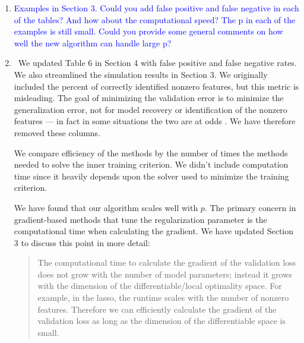 \documentclass[]{article}
\newcommand{\point}[1]{\item \textcolor{blue}{#1}}
\newcommand{\reply}{\item[]\ }
\begin{document}
\begin{enumerate}
		\point{Examples in Section 3. Could you add false positive and false negative in each of the tables? And how about the computational speed? The p in each of the examples is still small. Could you provide some general comments on how well the new algorithm can handle large p?}
		
		\reply We updated Table 6 in Section 4 with false positive and false negative rates. We also streamlined the simulation results in Section 3. We originally included the percent of correctly identified nonzero features, but this metric is misleading. The goal of minimizing the validation error is to minimize the generalization error, not for model recovery or identification of the nonzero features --- in fact in some situations the two are at odds \citep{yang2005can, arlot2010survey}. We have therefore removed these columns.
		
		We compare efficiency of the methods by the number of times the methods needed to solve the inner training criterion. We didn't include computation time since it heavily depends upon the solver used to minimize the training criterion.
		
		We have found that our algorithm scales well with $p$. The primary concern in gradient-based methods that tune the regularization parameter is the computational time when calculating the gradient. We have updated Section 3 to discuss this point in more detail:
		
		\begin{quote}
			 The computational time to calculate the gradient of the validation loss does not grow with the number of model parameters; instead it grows with the dimension of the differentiable/local optimality space. For example, in the lasso, the runtime scales with the number of nonzero features. Therefore we can efficiently calculate the gradient of the validation loss as long as the dimension of the differentiable space is small.
		\end{quote}
		
	\end{enumerate}



\end{document}
